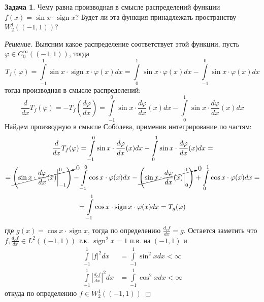 \documentclass[12pt,a4paper]{article}
\theoremstyle{definition}
\newtheorem{exercise}{Задача}
\newenvironment{solution}
{\renewcommand\qedsymbol{$\blacksquare$}\begin{proof}[Решение]}
{\end{proof}}
\DeclareMathOperator{\sign}{sign}
\begin{document}
\begin{exercise}
	Чему равна производная в смысле распределений функции \\ $f(x) = \sin{x} \cdot \sign{x}$? Будет ли эта функция принадлежать пространству $W_2^1 ((-1, 1))$?
\end{exercise}
\begin{solution}
	Выясним какое распределение соответствует этой функции, пусть $\varphi \in C_0^\infty ((-1, 1))$, тогда
	\begin{equation*}
		T_f (\varphi) = \int\limits_{-1}^{1}{\sin{x} \cdot \sign{x} \cdot \varphi (x) dx} = \int\limits_{0}^{1}{\sin{x} \cdot \varphi(x) dx} - \int\limits_{-1}^{0}{\sin{x} \cdot \varphi(x) dx}
	\end{equation*}
	тогда производная в смысле распределений:
	\begin{equation*}
		\frac{d}{dx} T_f (\varphi) = - T_f \left(\frac{d\varphi}{dx}\right) = \int\limits_{-1}^{0}{\sin{x} \cdot \frac{d\varphi}{dx} (x) dx} - \int\limits_{0}^{1}{\sin{x} \cdot \frac{d\varphi}{dx} (x) dx} 
	\end{equation*}
	Найдем производную в смысле Соболева, применив интегрирование по частям:
	\begin{multline*}
		\frac{d}{dx} T_f (\varphi) = \int\limits_{-1}^{0}{\sin{x} \cdot \frac{d\varphi}{dx} (x) dx} - \int\limits_{0}^{1}{\sin{x} \cdot \frac{d\varphi}{dx} (x) dx} = \\ = 
		\cancelto{0}{\left( \sin{x} \cdot \frac{d\varphi}{dx} (x) \biggr\rvert_{-1}^{0} \right)} - \int\limits_{-1}^{0}{\cos{x} \cdot \varphi(x) dx} - \cancelto{0}{\left( \sin{x} \cdot \frac{d\varphi}{dx} (x) \biggr\rvert_{0}^{1} \right)} + \int\limits_{0}^{1}{\cos{x} \cdot \varphi(x) dx} = \\ = \int\limits_{-1}^{1}{\cos{x} \cdot \sign{x} \cdot \varphi(x) dx} = T_g (\varphi)
	\end{multline*}
	где $g(x) = \cos{x} \cdot \sign{x}$, тогда по определению $\frac{d_c f}{dx} = g$. Остается заметить что $f, \frac{d_c f}{dx} \in L^2 ((-1, 1))$ т.к. $\sign^2 {x} = 1$ п.в. на $(-1, 1)$ и
	\begin{align*}
		\int\limits_{-1}^{1}{|f|^2 dx} &= \int\limits_{-1}^{1}{\sin^2 {x} dx} < \infty \\
		\int\limits_{-1}^{1}{\left|\frac{d_c f}{dx}\right|^2 dx} &= \int\limits_{-1}^{1}{\cos^2 {x} dx} < \infty
	\end{align*}
	откуда по определению $f \in W_2^1 ((-1, 1))$
\end{solution}
\newpage
\end{document}
